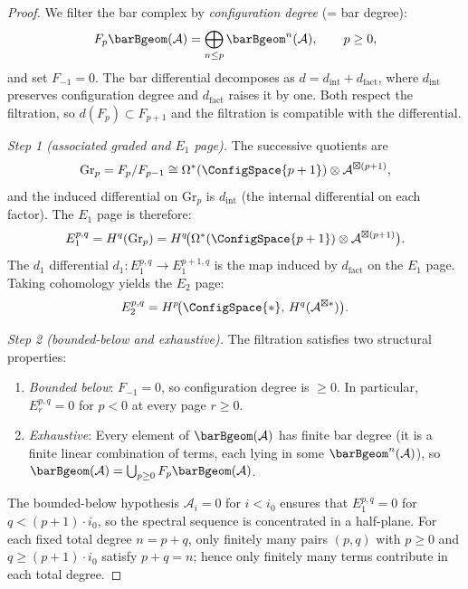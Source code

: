 \begin{proof}
We filter the bar complex by \emph{configuration degree} (= bar degree):
\[F_p\barBgeom(\mathcal{A}) = \bigoplus_{n \leq p} \barBgeom^n(\mathcal{A}), \qquad p \ge 0,\]
and set $F_{-1} = 0$. The bar differential decomposes as
$d = d_{\mathrm{int}} + d_{\mathrm{fact}}$, where $d_{\mathrm{int}}$ preserves
configuration degree and $d_{\mathrm{fact}}$ raises it by one. Both respect the
filtration, so $d(F_p) \subset F_{p+1}$ and the filtration is compatible with the
differential.

\emph{Step 1 (associated graded and $E_1$ page).}
The successive quotients are
\[\mathrm{Gr}_p = F_p / F_{p-1} \cong \Omega^*(\ConfigSpace{p+1}) \otimes
\mathcal{A}^{\boxtimes(p+1)},\]
and the induced differential on $\mathrm{Gr}_p$ is $d_{\mathrm{int}}$ (the
internal differential on each factor). The $E_1$ page is therefore:
\[E_1^{p,q} = H^q(\mathrm{Gr}_p) = H^q\!\bigl(\Omega^*(\ConfigSpace{p+1})
\otimes \mathcal{A}^{\boxtimes(p+1)}\bigr).\]
The $d_1$ differential $d_1\colon E_1^{p,q} \to E_1^{p+1,q}$ is the map induced
by $d_{\mathrm{fact}}$ on the $E_1$ page. Taking cohomology yields the $E_2$ page:
\[E_2^{p,q} = H^p\!\bigl(\ConfigSpace{*},\, H^q(\mathcal{A}^{\boxtimes *})\bigr).\]

\emph{Step 2 (bounded-below and exhaustive).}
The filtration satisfies two structural properties:
\begin{enumerate}
\item \emph{Bounded below}: $F_{-1} = 0$, so configuration degree is $\ge 0$.
 In particular, $E_r^{p,q} = 0$ for $p < 0$ at every page $r \ge 0$.
\item \emph{Exhaustive}: Every element of $\barBgeom(\mathcal{A})$ has finite bar
 degree (it is a finite linear combination of terms, each lying in some
 $\barBgeom^n(\mathcal{A})$), so
 $\barBgeom(\mathcal{A}) = \bigcup_{p \ge 0} F_p\barBgeom(\mathcal{A})$.
\end{enumerate}
The bounded-below hypothesis $\mathcal{A}_i = 0$ for $i < i_0$ ensures that
$E_1^{p,q} = 0$ for $q < (p+1)\cdot i_0$, so the spectral sequence is concentrated
in a half-plane. For each fixed total degree $n = p + q$, only finitely many pairs
$(p,q)$ with $p \ge 0$ and $q \ge (p+1)\cdot i_0$ satisfy $p + q = n$; hence only
finitely many terms contribute in each total degree.


\end{proof}
